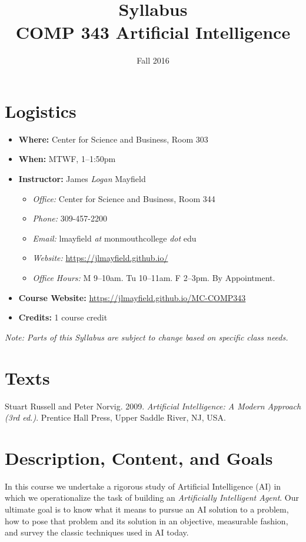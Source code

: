 \documentclass[]{tufte-handout}
\title{Syllabus \\ COMP 343 Artificial Intelligence}
\author{}
\date{Fall 2016}
\begin{document}
\maketitle

\section{Logistics}
\begin{itemize}
\item \textbf{Where: } Center for Science and Business, Room 303
\item \textbf{When: } MTWF,  1--1:50pm
\item \textbf{Instructor:} James \textit{Logan} Mayfield
\begin{itemize}
\item \textit{Office: } Center for Science and Business, Room 344
\item \textit{Phone: } 309-457-2200 %
\item \textit{Email: } lmayfield \textit{at} monmouthcollege \textit{dot} edu
\item \textit{Website: } \url{https://jlmayfield.github.io/}
\item \textit{Office Hours: } M 9--10am. Tu 10--11am. F 2--3pm. By Appointment.
\end{itemize}
\item \textbf{Course Website: } \url{https://jlmayfield.github.io/MC-COMP343}
\item \textbf{Credits: } 1 course credit
\end{itemize}
\emph{Note: Parts of this Syllabus are subject to change based on specific class needs.}

\section{Texts}

\noindent Stuart Russell and Peter Norvig. 2009. \textit{Artificial Intelligence: A Modern Approach (3rd ed.)}. Prentice Hall Press, Upper Saddle River, NJ, USA\@.

\section{Description, Content, and Goals}

In this course we undertake a rigorous study of Artificial Intelligence (AI) in which we
operationalize the task of building an \textit{Artificially Intelligent Agent}. Our
ultimate goal is to know what it means to pursue an AI solution to a problem, how
to pose that problem and its solution in an objective, measurable fashion, and
survey the classic techniques used in AI today.
\end{document}
